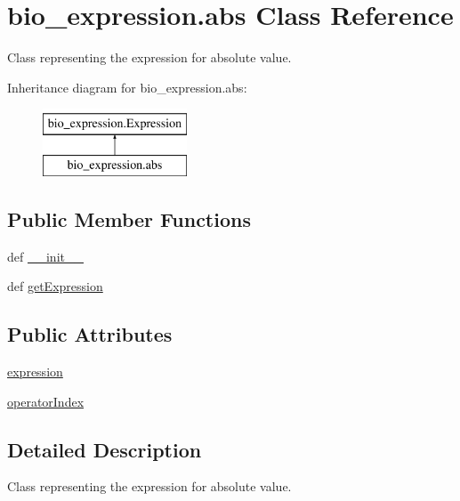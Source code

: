 \hypertarget{classbio__expression_1_1abs}{\section{bio\+\_\+expression.\+abs Class Reference}
\label{classbio__expression_1_1abs}
}


Class representing the expression for absolute value.  


Inheritance diagram for bio\+\_\+expression.\+abs\+:\begin{figure}[H]
\begin{center}
\leavevmode
\includegraphics[height=2.000000cm]{d0/d6f/classbio__expression_1_1abs}
\end{center}
\end{figure}
\subsection*{Public Member Functions}
\begin{DoxyCompactItemize}
\item 
def \hyperlink{classbio__expression_1_1abs_a4f3631b44e2abbd201fc113aa60ada59}{\+\_\+\+\_\+init\+\_\+\+\_\+}
\item 
def \hyperlink{classbio__expression_1_1abs_ac96d94531da4fd4e3680a4539ed2e621}{get\+Expression}
\end{DoxyCompactItemize}
\subsection*{Public Attributes}
\begin{DoxyCompactItemize}
\item 
\hyperlink{classbio__expression_1_1abs_af74ad5264822b73581b7ead7fbe46768}{expression}
\item 
\hyperlink{classbio__expression_1_1abs_a865d909c93911c8d51db150d4aa9e727}{operator\+Index}
\end{DoxyCompactItemize}


\subsection{Detailed Description}
Class representing the expression for absolute value. 

